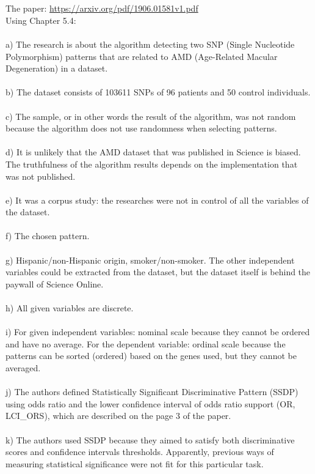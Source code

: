 \documentclass[a4paper,12pt]{article}
\newcommand{\<}{\langle}
\renewcommand{\>}{\rangle}
\newcommand{\1}{\mathbbm{1}}
\begin{document}
\section{}
The paper: \url{https://arxiv.org/pdf/1906.01581v1.pdf} \\
Using Chapter 5.4: \\\\
a) The research is about the algorithm detecting two SNP (Single Nucleotide Polymorphism) patterns that are related to AMD (Age-Related Macular Degeneration) in a dataset. \\\\
b) The dataset consists of 103611 SNPs of 96 patients and 50 control individuals. \\\\
c) The sample, or in other words the result of the algorithm, was not random because the algorithm does not use randomness when selecting patterns. \\\\
d) It is unlikely that the AMD dataset that was published in Science is biased. The truthfulness of the algorithm results depends on the implementation that was not published. \\\\
e) It was a corpus study: the researches were not in control of all the variables of the dataset. \\\\
f) The chosen pattern. \\\\
g) Hispanic/non-Hispanic origin, smoker/non-smoker. The other independent variables could be extracted from the dataset, but the dataset itself is behind the paywall of Science Online. \\\\
h) All given variables are discrete. \\\\
i) For given independent variables: nominal scale because they cannot be ordered and have no average. For the dependent variable: ordinal scale because the patterns can be sorted (ordered) based on the genes used, but they cannot be averaged. \\\\
j) The authors defined Statistically Significant Discriminative Pattern (SSDP) using odds ratio and the lower confidence interval of odds ratio support (OR, LCI\_ORS), which are described on the page 3 of the paper. \\\\
k) The authors used SSDP because they aimed to satisfy both discriminative scores and confidence intervals thresholds. Apparently, previous ways of measuring statistical significance were not fit for this particular task.
\end{document}
